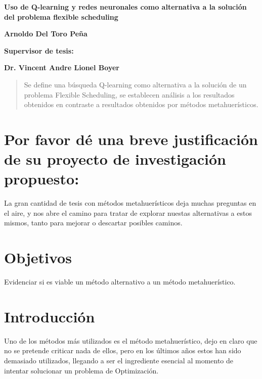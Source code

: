 \documentclass[letterpaper, 10 pt]{article}
\newcommand{\Tittle}[1]{ {\Huge \bfseries{ #1 }}  }
\newcommand{\subTittle}[1]{ {\Large \bfseries{ #1 }}  }
\begin{document}
\sffamily %
\begin{center}

	\Tittle{Uso de Q-learning y redes neuronales como alternativa a la solución del problema flexible scheduling} \par
	\subTittle{Arnoldo Del Toro Peña}  \par
	\subTittle{Supervisor de tesis:} \par
	\subTittle{Dr. Vincent Andre Lionel}\textbf{\Large Boyer } 
\end{center}

\begin{abstract}
	Se define una búsqueda Q-learning como alternativa a la solución de un problema Flexible Scheduling, se establecen análisis a los resultados obtenidos en contraste a resultados obtenidos por métodos metahuerísticos.
\end{abstract}

\section*{Por favor dé una breve justificación de su proyecto de investigación propuesto:}
La gran cantidad de tesis con métodos metahuerísticos deja muchas preguntas en el aire, y nos abre el camino para tratar de explorar nuestas alternativas a estos mismos, tanto para mejorar o descartar posibles caminos.

\section*{Objetivos}
Evidenciar si es viable un método alternativo a un método metahuerístico.

\section*{Introducción}

Uno de los métodos más utilizados es el método metahuerístico, dejo en claro que no se pretende criticar nada de ellos, pero en los últimos años estos han sido demasiado utilizados, llegando a ser el ingrediente esencial al momento de intentar solucionar un problema de Optimización.
\end{document}
